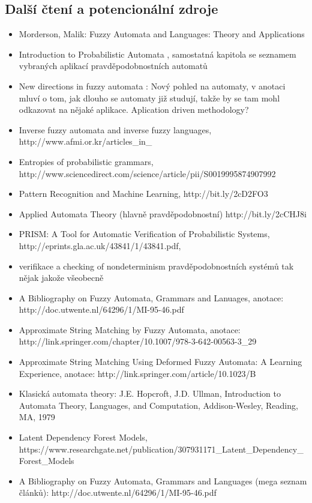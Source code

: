 \documentclass[a4paper,10pt]{article}
\begin{document}
\subsection{Další čtení a potencionální zdroje}
\begin{itemize}
 \item Morderson, Malik: Fuzzy Automata and Languages: Theory and Applications \cite{MorMal-FuzzAutAndLangs}
 \item Introduction to Probabilistic Automata \cite{Paz-IntroProbAut}, samostatná kapitola se seznamem vybraných aplikací pravděpodobnostních automatů
 \item New directions in fuzzy automata \cite{DooKre-NewDirFuzzAut}: Nový pohled na automaty, v anotaci mluví o tom, jak dlouho se automaty již studují, takže by se tam mohl odkazovat na nějaké aplikace. Aplication driven methodology?
 \item Inverse fuzzy automata and inverse fuzzy languages, http://www.afmi.or.kr/articles\_in\_%
 \item Entropies of probabilistic grammars, http://www.sciencedirect.com/science/article/pii/S0019995874907992
 \item Pattern Recognition and Machine Learning, http://bit.ly/2cD2FO3
 \item Applied Automata Theory (hlavně pravděpodobnostní) http://bit.ly/2cCHJ8i
 \item PRISM: A Tool for Automatic Verification of Probabilistic Systems, http://eprints.gla.ac.uk/43841/1/43841.pdf,
 \item verifikace a checking of nondeterminism pravděpodobnostních systémů tak nějak jakože všeobecně
 \item A Bibliography on Fuzzy Automata, Grammars and Lanuages, anotace: http://doc.utwente.nl/64296/1/MI-95-46.pdf
 \item Approximate String Matching by Fuzzy Automata, anotace: http://link.springer.com/chapter/10.1007/978-3-642-00563-3\_29
 \item Approximate String Matching Using Deformed Fuzzy Automata: A Learning Experience, anotace: http://link.springer.com/article/10.1023/B%
 \item Klasická automata theory: J.E. Hopcroft, J.D. Ullman, Introduction to Automata Theory, Languages, and Computation, Addison-Wesley, Reading,
MA, 1979
 \item Latent Dependency Forest Models, https://www.researchgate.net/publication/307931171\_Latent\_Dependency\_Forest\_Models
 \item A Bibliography on Fuzzy Automata, Grammars and Languages (mega seznam článků): http://doc.utwente.nl/64296/1/MI-95-46.pdf
 
 
 \end{itemize}
\end{document}
